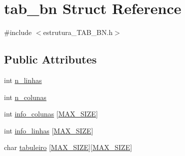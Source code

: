\hypertarget{structtab__bn}{\section{tab\-\_\-bn Struct Reference}
\label{structtab__bn}
}


{\ttfamily \#include $<$estrutura\-\_\-\-T\-A\-B\-\_\-\-B\-N.\-h$>$}

\subsection*{Public Attributes}
\begin{DoxyCompactItemize}
\item 
int \hyperlink{structtab__bn_a986e57359e4e4630edd0994d615b3eaa}{n\-\_\-linhas}
\item 
int \hyperlink{structtab__bn_a42bb71ad662aa571a66445b1d81d481e}{n\-\_\-colunas}
\item 
int \hyperlink{structtab__bn_a5db4acd87d1a3dfc8b334e3d8564107b}{info\-\_\-colunas} \mbox{[}\hyperlink{stel_8h_a0592dba56693fad79136250c11e5a7fe}{M\-A\-X\-\_\-\-S\-I\-Z\-E}\mbox{]}
\item 
int \hyperlink{structtab__bn_a0f37b7b7a722455c0d5fdb3a0b21eb18}{info\-\_\-linhas} \mbox{[}\hyperlink{stel_8h_a0592dba56693fad79136250c11e5a7fe}{M\-A\-X\-\_\-\-S\-I\-Z\-E}\mbox{]}
\item 
char \hyperlink{structtab__bn_a35d0fd28d6f47a6705a24fbcbdde4d63}{tabuleiro} \mbox{[}\hyperlink{stel_8h_a0592dba56693fad79136250c11e5a7fe}{M\-A\-X\-\_\-\-S\-I\-Z\-E}\mbox{]}\mbox{[}\hyperlink{stel_8h_a0592dba56693fad79136250c11e5a7fe}{M\-A\-X\-\_\-\-S\-I\-Z\-E}\mbox{]}
\end{DoxyCompactItemize}


